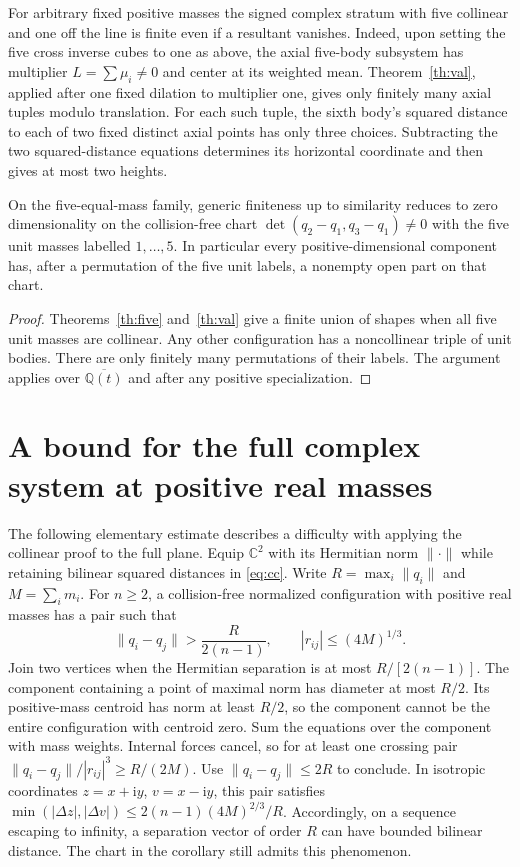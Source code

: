 \documentclass[11pt]{article}
\begin{document}
For arbitrary fixed positive masses the signed complex stratum with five collinear and one off the line is finite even if a resultant vanishes. Indeed, upon setting the five cross inverse cubes to one as above, the axial five-body subsystem has multiplier $L=\sum \mu_i\ne0$ and center at its weighted mean. Theorem~\ref{th:val}, applied after one fixed dilation to multiplier one, gives only finitely many axial tuples modulo translation. For each such tuple, the sixth body's squared distance to each of two fixed distinct axial points has only three choices. Subtracting the two squared-distance equations determines its horizontal coordinate and then gives at most two heights.

\begin{corollary}
On the five-equal-mass family, generic finiteness up to similarity reduces to zero dimensionality on the collision-free chart $\det(q_2-q_1,q_3-q_1)\ne0$ with the five unit masses labelled $1,\ldots,5$. In particular every positive-dimensional component has, after a permutation of the five unit labels, a nonempty open part on that chart.
\end{corollary}
\begin{proof}
Theorems~\ref{th:five} and~\ref{th:val} give a finite union of shapes when all five unit masses are collinear. Any other configuration has a noncollinear triple of unit bodies. There are only finitely many permutations of their labels. The argument applies over $\overline{\mathbb Q(t)}$ and after any positive specialization.\end{proof}

\section{A bound for the full complex system at positive real masses}
The following elementary estimate describes a difficulty with applying the collinear proof to the full plane. Equip $\mathbb C^2$ with its Hermitian norm $\|\cdot\|$ while retaining bilinear squared distances in \eqref{eq:cc}. Write $R=\max_i\|q_i\|$ and $M=\sum_i m_i$. For $n\ge2$, a collision-free normalized configuration with positive real masses has a pair such that
\[
 \|q_i-q_j\|>\frac R{2(n-1)},\qquad |r_{ij}|\le (4M)^{1/3}.
\]
Join two vertices when the Hermitian separation is at most $R/[2(n-1)]$. The component containing a point of maximal norm has diameter at most $R/2$. Its positive-mass centroid has norm at least $R/2$, so the component cannot be the entire configuration with centroid zero. Sum the equations over the component with mass weights. Internal forces cancel, so for at least one crossing pair $\|q_i-q_j\|/|r_{ij}|^3\ge R/(2M)$. Use $\|q_i-q_j\|\le2R$ to conclude. In isotropic coordinates $z=x+\mathrm i y$, $v=x-\mathrm i y$, this pair satisfies $\min(|\Delta z|,|\Delta v|)\le2(n-1)(4M)^{2/3}/R$. Accordingly, on a sequence escaping to infinity, a separation vector of order $R$ can have bounded bilinear distance. The chart in the corollary still admits this phenomenon.
\end{document}
